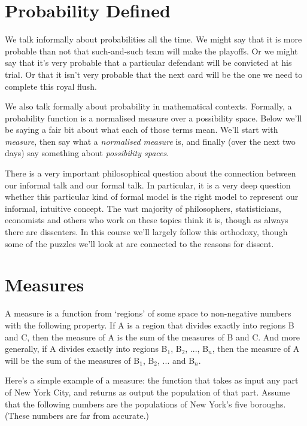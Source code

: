 \section{Probability Defined}
We talk informally about probabilities all the time. We might say that it is more probable than not that such-and-such team will make the playoffs. Or we might say that it's very probable that a particular defendant will be convicted at his trial. Or that it isn't very probable that the next card will be the one we need to complete this royal flush.

We also talk formally about probability in mathematical contexts. Formally, a probability function is a normalised measure over a possibility space. Below we'll be saying a fair bit about what each of those terms mean. We'll start with \textit{measure}, then say what a \textit{normalised measure} is, and finally (over the next two days) say something about \textit{possibility spaces}.

There is a very important philosophical question about the connection between our informal talk and our formal talk. In particular, it is a very deep question whether this particular kind of formal model is the right model to represent our informal, intuitive concept. The vast majority of philosophers, statisticians, economists and others who work on these topics think it is, though as always there are dissenters. In this course we'll largely follow this orthodoxy, though some of the puzzles we'll look at are connected to the reasons for dissent.

\section{Measures}
A measure is a function from `regions' of some space to non-negative numbers with the following property. If A is a region that divides exactly into regions B and C, then the measure of A is the sum of the measures of B and C. And more generally, if A divides exactly into regions B$_1$, B$_2$, ..., B$_n$, then the measure of A will be the sum of the measures of B$_1$, B$_2$, ... and B$_n$.

Here's a simple example of a measure: the function that takes as input any part of New York City, and returns as output the population of that part. Assume that the following numbers are the populations of New York's five boroughs. (These numbers are far from accurate.)

